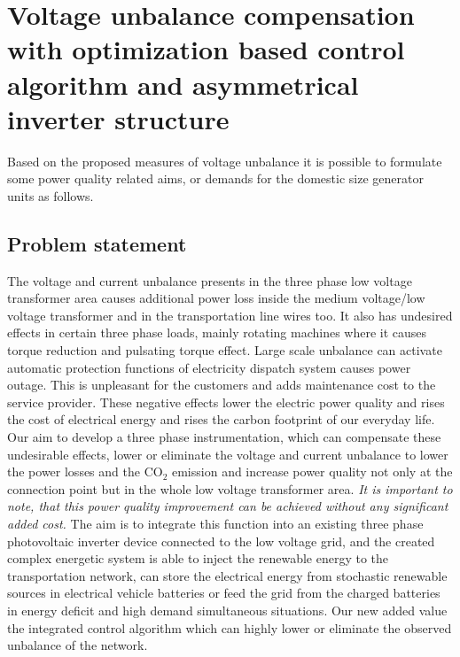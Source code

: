 
\section{Voltage unbalance compensation with optimization based control algorithm and asymmetrical inverter structure}

    Based on the proposed measures of voltage unbalance it is possible to formulate some power quality related aims, or demands for the domestic size generator units as follows.

    \subsection{Problem statement}

    The voltage and current unbalance presents in the three phase low voltage transformer area causes additional power loss inside the medium voltage/low voltage transformer and in the transportation line wires too. It also has undesired effects in certain three phase loads, mainly rotating machines where it causes torque reduction and pulsating torque effect. Large scale unbalance can activate automatic protection functions of electricity dispatch system causes power outage. This is unpleasant for the customers and adds maintenance cost to the service provider. These negative effects lower the electric power quality and rises the cost of electrical energy and rises the carbon footprint of our everyday life. Our aim to develop a three phase instrumentation, which can compensate these undesirable effects, lower or eliminate the voltage and current unbalance to lower the power losses and the CO${}_2$ emission and increase power quality not only at the connection point but in the whole low voltage transformer area. \emph{It is important to note, that this power quality improvement can be achieved without any significant added cost.} The aim is to integrate this function into an existing three phase photovoltaic inverter device connected to the low voltage grid, and the created complex energetic system is able to inject the renewable energy to the transportation network, can store the electrical energy from stochastic renewable sources in electrical vehicle batteries or feed the grid from the charged batteries in energy deficit and high demand simultaneous situations. Our new added value the integrated control algorithm which can highly lower or eliminate the observed unbalance of the network.


